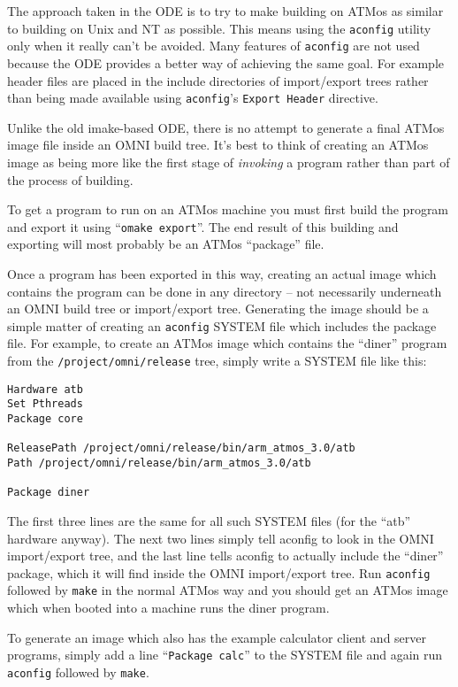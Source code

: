 \documentclass[11pt,twoside,onecolumn]{article}
\begin{document}
The approach taken in the ODE is to try to make building on ATMos as similar to
building on Unix and NT as possible.  This means using the {\tt aconfig}
utility only when it really can't be avoided.  Many features of {\tt aconfig}
are not used because the ODE provides a better way of achieving the same goal.
For example header files are placed in the include directories of import/export
trees rather than being made available using {\tt aconfig}'s {\tt Export
Header} directive.

Unlike the old imake-based ODE, there is no attempt to generate a final ATMos
image file inside an OMNI build tree.  It's best to think of creating an ATMos
image as being more like the first stage of {\em invoking} a program rather
than part of the process of building.

To get a program to run on an ATMos machine you must first build the program
and export it using ``{\tt omake export}''.  The end result of this building
and exporting will most probably be an ATMos ``package'' file.

\label{imageanywhere}
Once a program has been exported in this way, creating an actual image which
contains the program can be done in any directory -- not necessarily underneath
an OMNI build tree or import/export tree.  Generating the image should be
a simple matter of creating an {\tt aconfig} SYSTEM file which includes the
package file.  For example, to create an ATMos image which contains the
``diner'' program from the {\tt /project/omni/release} tree, simply write a
SYSTEM file like this:

{\footnotesize \begin{verbatim}
Hardware atb
Set Pthreads
Package core

ReleasePath /project/omni/release/bin/arm_atmos_3.0/atb
Path /project/omni/release/bin/arm_atmos_3.0/atb

Package diner
\end{verbatim}}

The first three lines are the same for all such SYSTEM files (for the ``atb''
hardware anyway).  The next two lines simply tell aconfig to look in the OMNI
import/export tree, and the last line tells aconfig to actually include the
``diner'' package, which it will find inside the OMNI import/export tree.  Run
{\tt aconfig} followed by {\tt make} in the normal ATMos way and you should get
an ATMos image which when booted into a machine runs the diner program.

To generate an image which also has the example calculator client and server
programs, simply add a line ``{\tt Package calc}'' to the SYSTEM file and again
run {\tt aconfig} followed by {\tt make}.
\end{document}

